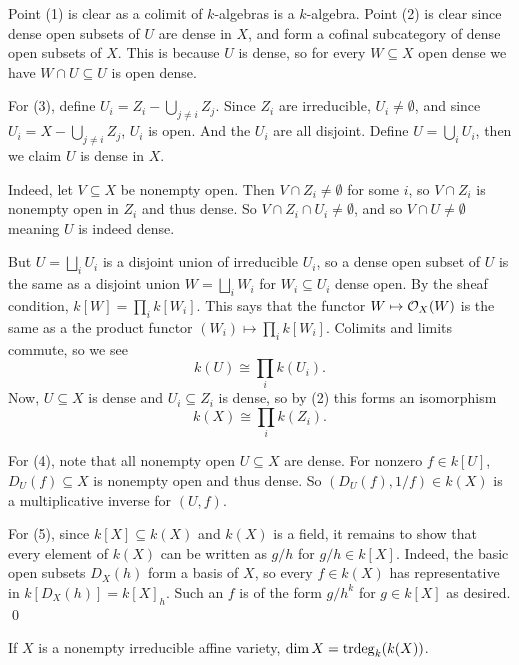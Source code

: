 \elemm

\bproof

    Point (1) is clear as a colimit of $k$-algebras is a $k$-algebra.
    Point (2) is clear since dense open subsets of $U$ are dense in $X$, and form a cofinal subcategory of dense open subsets of $X$.
    This is because $U$ is dense, so for every $W\subseteq X$ open dense we have $W\cap U\subseteq U$ is open dense.

    For (3), define $U_i=Z_i-\bigcup_{j\neq i}Z_j$.
    Since $Z_i$ are irreducible, $U_i\neq\emptyset$, and since $U_i=X-\bigcup_{j\neq i}Z_j$, $U_i$ is open.
    And the $U_i$ are all disjoint.
    Define $U=\bigcup_iU_i$, then we claim $U$ is dense in $X$.

    Indeed, let $V\subseteq X$ be nonempty open.
    Then $V\cap Z_i\neq\emptyset$ for some $i$, so $V\cap Z_i$ is nonempty open in $Z_i$ and thus dense.
    So $V\cap Z_i\cap U_i\neq\emptyset$, and so $V\cap U\neq\emptyset$ meaning $U$ is indeed dense.

    But $U=\bigsqcup_iU_i$ is a disjoint union of irreducible $U_i$, so a dense open subset of $U$ is the same as a disjoint union $W=\bigsqcup_iW_i$
    for $W_i\subseteq U_i$ dense open.
    By the sheaf condition, $k[W]=\prod_ik[W_i]$.
    This says that the functor $W\mapsto{{\cal O}}_X(W)$ is the same as a the product functor $(W_i)\mapsto\prod_ik[W_i]$.
    Colimits and limits commute, so we see
    $$ k(U) \cong \prod_ik(U_i) . $$
    Now, $U\subseteq X$ is dense and $U_i\subseteq Z_i$ is dense, so by (2) this forms an isomorphism
    $$ k(X) \cong \prod_ik(Z_i) . $$

    For (4), note that all nonempty open $U\subseteq X$ are dense.
    For nonzero $f\in k[U]$, $D_U(f)\subseteq X$ is nonempty open and thus dense.
    So $(D_U(f),1/f)\in k(X)$ is a multiplicative inverse for $(U,f)$.

    For (5), since $k[X]\subseteq k(X)$ and $k(X)$ is a field, it remains to show that every element of $k(X)$ can be written as $g/h$ for $g/h\in k[X]$.
    Indeed, the basic open subsets $D_X(h)$ form a basis of $X$, so every $f\in k(X)$ has representative in $k[D_X(h)]=k[X]_h$.
    Such an $f$ is of the form $g/h^k$ for $g\in k[X]$ as desired.
    \qed

\eproof

\bcoro

    If $X$ is a nonempty irreducible affine variety, $\dim X={\mathop{\rm trdeg}}_k(k(X))$.

\ecoro

\bproof

